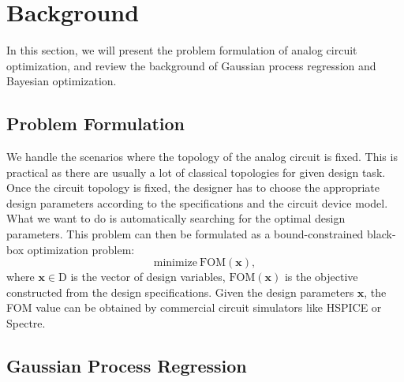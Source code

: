 \section{Background}

In this section, we will present the problem formulation of analog circuit optimization, and review the background of Gaussian process regression and Bayesian optimization.

\subsection{Problem Formulation}


We handle the scenarios where the topology of the analog circuit is fixed. This
is practical as there are usually a lot of classical topologies for given
design task. Once the circuit topology is fixed, the designer has to choose the
appropriate design parameters according to the specifications and the circuit
device model. What we want to do is automatically searching for the optimal
design parameters. This problem can then be formulated as a bound-constrained
black-box optimization problem:
\begin{equation}
    \label{eq:Formulation}
    \text{minimize}~\mathrm{FOM}(\bm{x}),
\end{equation}
where $\bm{x} \in \textrm{D}$ is the vector of design variables,
$\mathrm{FOM}(\bm{x})$ is the objective constructed from the design
specifications. Given the design parameters $\bm{x}$, the FOM value can be
obtained by commercial circuit simulators like HSPICE or Spectre.



\subsection{Gaussian Process Regression}

